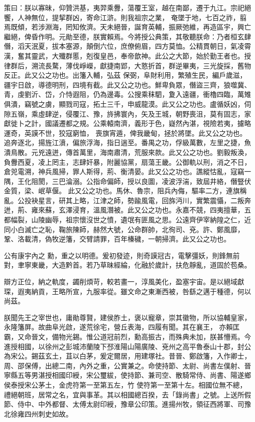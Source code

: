 \begin{pinyinscope}
 策曰：朕以寡昧，仰贊洪基，夷羿乘釁，蕩覆王室，越在南鄙，遷于九江。宗祀絕饗，人神無位，提挈群凶，寄命江滸。則我祖宗之業，
 奄墜于地，七百之祚，翦焉既傾，若涉淵海，罔知攸濟。天未絕晉，誕育英輔，振厥弛維，再造區宇，興亡繼絕，俾昏作明。元勛至德，朕實賴焉。今將授公典策，其敬聽朕命：乃者桓玄肆僭，滔天泯夏，拔本塞源，顛倒六位，庶僚俯眉，四方莫恤。公精貫朝日，氣凌霄漢，奮其靈武，大殲群慝，剋復皇邑，奉帝歆神。此公之大節，始於勤王者也。授律群后，溯流長騖，薄伐崢嶸，獻捷南郢，大憝折首，群逆畢夷，三光旋採，舊物反正。此又公之功也。出籓入輔，弘茲
 保弼，阜財利用，繁殖生民，編戶歲滋，疆宇日啟，導德明刑，四境有截。此又公之功也。鮮卑負眾，僭盜三齊，狼噬冀、青，虔劉沂、岱，介恃遐阻，仍為邊毒。公搜乘秣駟，夐入遠疆，衝櫓四臨，萬雉俱潰，竊號之虜，顯戮司寇，拓土三千，申威龍漠。此又公之功也。盧循妖凶，伺隙五嶺，乘虛肆逆，侵覆江、豫，旍拂寰內，矢及王城，朝野喪沮，莫有固志，家獻徙卜之計，國議遷都之規。公乘轅南濟，義形于色，嶷然內湛，視險若夷，攄略運奇，英謨不世，狡寇窮恤，
 喪旗宵遁，俾我畿甸，拯於將墜。此又公之功也。追奔逐北，揚旌江濆，偏旅浮海，指日遄至。番禺之功，俘級萬數，左里之捷，魚潰鳥散。元兇遠迸，傳首萬里，海南肅清，荒服來款。此又公之功也。劉毅叛渙，負釁西夏，凌上罔主，志肆奸暴，附麗協黨，扇蕩王畿。公御軌以刑，消之不日，倉兕電溯，神兵風掃，罪人斯得，荊、衡清晏。此又公之功也。譙縱怙亂，寇竊一隅，王化阻閡，三巴淪溺。公指命偏師，授以良圖，凌波浮湍，致屆井絡，僭豎伏金質，梁、岷草偃。
 此又公之功也。馬休、魯宗，阻兵內侮，驅率二方，連旗稱亂。公投袂星言，研其上略，江津之師，勢踰風電，回旆沔川，實繁震懾，二叛奔迸，荊、雍來蘇，玄澤浸育，溫風潛被。此又公之功也。永嘉不競，四夷擅華，五都幅裂，山陵幽辱，祖宗懷沒世之憤，遺氓有匪風之思。公遠齊伊宰納隍之仁，近同小白滅亡之恥，鞠旅陳師，赫然大號，公命群帥，北徇司、兗。許、鄭風靡，鞏、洛載清，偽牧逆籓，交臂請罪，百年榛穢，一朝掃濟。此又公之功也。



 公有康宇內之
 勳，重之以明德。爰初發迹，則奇謨冠古，電擊彊妖，則鋒無前對，聿寧東畿，大造黔首。若乃草昧經綸，化融於歲計，扶危靜亂，道固於苞桑。



 辯方正位，納之軌度，蠲削煩苛，較若畫一，淳風美化，盈塞宇宙。是以絕域獻琛，遐夷納貢，王略所宣，九服率從。雖文命之東漸西被，咎繇之邁于種德，何以尚茲。



 朕聞先王之宰世也，庸勛尊賢，建侯胙土，褒以寵章，崇其徽物，所以協輔皇家，永隆籓屏。故曲阜光啟，遂荒徐宅，營丘表海，四履有聞。其在襄王，
 亦賴匡霸，又命晉文，備物光錫。惟公道冠前烈，勳高振古，而殊典未加，朕甚懵焉。今進授相國，以徐州之彭城沛蘭陵下邳淮陽山陽廣陵、兗州之高平魯泰山十郡，封公為宋公。錫茲玄土，苴以白茅，爰定爾居，用建塚社。昔晉、鄭啟籓，入作卿士，周、邵保傅，出總二南，內外之重，公實兼之。命使持節、太尉、尚書左僕射、晉寧縣五等男湛授相國印綬，宋公璽紱，使持節、兼司空、散騎常侍、尚書、陽遂鄉侯泰授宋公茅土，金虎符第一至第五左，竹
 使符第一至第十左。相國位無不總，禮絕朝班，居常之名，宜與事革。其以相國總百揆，去「錄尚書」之號。上送所假節、侍中、中外都督、太傅太尉印綬，豫章公印策。進揚州牧，領征西將軍、司豫北徐雍四州刺史如故。




\end{pinyinscope}
